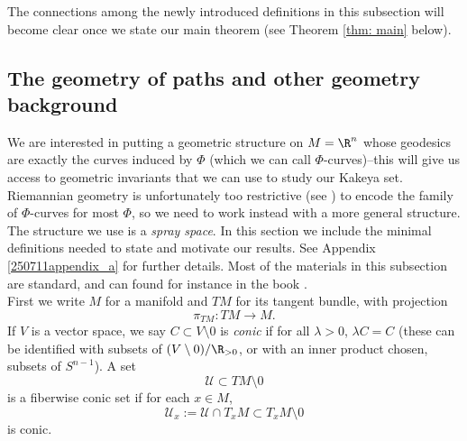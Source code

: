 \documentclass{article}
\numberwithin{equation}{section}
\theoremstyle{plain}
\begin{document}
The connections among the newly introduced definitions in this subsection will become clear once we state our main theorem (see Theorem \ref{thm: main} below). 






\subsection{The geometry of paths and other geometry background}

We are interested in putting a geometric structure on $M = \R^n$ whose geodesics are exactly the curves induced by $\Phi$ (which we can call $\Phi$-curves)--this will give us access to geometric invariants that we can use to study our Kakeya set.  
Riemannian geometry is unfortunately too restrictive (see \cite{DGGZ24}) to encode the family of $\Phi$-curves for most $\Phi$, so we need to work instead with a more general structure. The structure we use is a \emph{spray space}. In this section we include the minimal definitions needed to state and motivate our results. See Appendix \ref{250711appendix_a} for further details. Most of the materials in this subsection are standard, and can found for instance in the book \cite{Shen01}. \\

First we write $M$ for a manifold and $TM$ for its tangent bundle, with projection 
\begin{equation}
\pi_{TM} : TM \to M.
\end{equation}
If $V$ is a vector space, we say $C \subset V \setminus 0$ is \emph{conic} if for all $\lambda > 0$, $\lambda C = C$ (these can be identified with subsets of $(V\setminus 0)/ \R_{> 0}$, or with an inner product chosen, subsets of $S^{n-1}$). A set
\begin{equation}
\mathcal U \subset TM \setminus 0
\end{equation}
 is a fiberwise conic set if for each $x \in M$, 
\begin{equation}
\mathcal U_x := \mathcal U \cap T_xM \subset T_xM \setminus 0
\end{equation}
is conic. 
\end{document}
